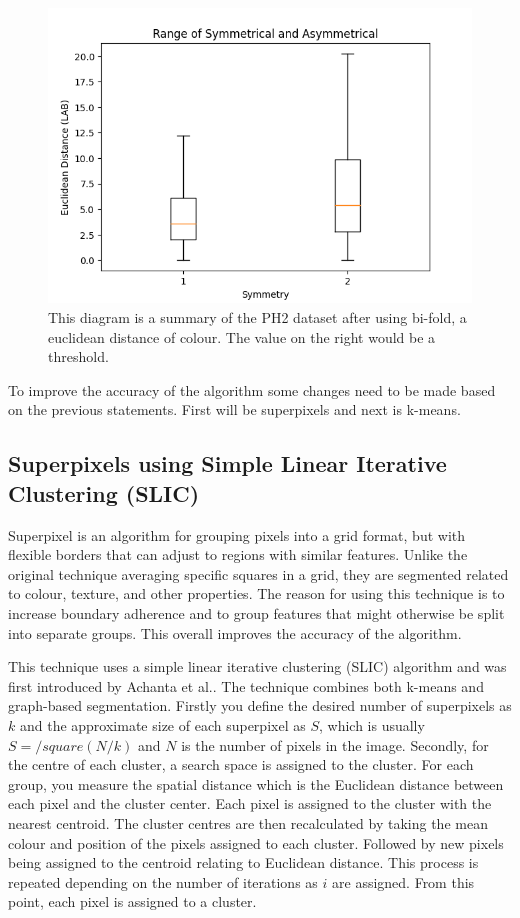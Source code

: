 \begin{figure} 
    \centering
    \includegraphics[scale=0.6]{images/symmetrical.png}
\caption{This diagram is a summary of the PH2 dataset after using bi-fold, a euclidean distance of colour. The value on the right would be a threshold.}
\end{figure}\label{symmetrical}
    
To improve the accuracy of the algorithm some changes need to be made based on the previous statements. First will be superpixels and next is k-means.

\subsection{Superpixels using Simple Linear Iterative Clustering (SLIC)}
Superpixel is an algorithm for grouping pixels into a grid format, but with flexible borders that can adjust to regions with similar features. Unlike the original technique averaging specific squares in a grid\cite{Kasmi2016}, they are segmented related to colour, texture, and other properties. The reason for using this technique is to increase boundary adherence and to group features that might otherwise be split into separate groups. This overall improves the accuracy of the algorithm.

This technique uses a simple linear iterative clustering (SLIC) algorithm and was first introduced by Achanta et al.\cite{Achanta2012}. The technique combines both k-means and graph-based segmentation. Firstly you define the desired number of superpixels as $k$ and the approximate size of each superpixel as $S$, which is usually $S = /square(N/k)$ and $N$ is the number of pixels in the image. Secondly, for the centre of each cluster, a search space is assigned to the cluster. For each group, you measure the spatial distance which is the Euclidean distance between each pixel and the cluster center. Each pixel is assigned to the cluster with the nearest centroid. The cluster centres are then recalculated by taking the mean colour and position of the pixels assigned to each cluster. Followed by new pixels being assigned to the centroid relating to Euclidean distance. This process is repeated depending on the number of iterations as $i$ are assigned. From this point, each pixel is assigned to a cluster.

